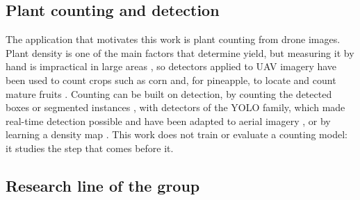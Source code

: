 \subsection{Plant counting and detection}

The application that motivates this work is plant counting from drone images. Plant density is one of the main factors that determine yield, but measuring it by hand is impractical in large areas \cite{Kitano2019}, so detectors applied to UAV imagery have been used to count crops such as corn \cite{Kitano2019,Osco2021} and, for pineapple, to locate and count mature fruits \cite{Shiu2023}. Counting can be built on detection, by counting the detected boxes or segmented instances \cite{Machefer2020,Bumbaca2025}, with detectors of the YOLO family, which made real-time detection possible \cite{Redmon2016} and have been adapted to aerial imagery \cite{Tang2024}, or by learning a density map \cite{Lempitsky2010,Ayalew2020}. This work does not train or evaluate a counting model: it studies the step that comes before it.

\subsection{Research line of the group}

